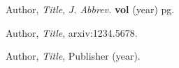\documentclass[a4paper,11pt]{article}
\begin{document}
\begin{thebibliography}{99}

Author, \emph{Title}, \emph{J. Abbrev.} {\bf vol} (year) pg.

Author, \emph{Title},
arxiv:1234.5678.

Author, \emph{Title},
Publisher (year).





\end{thebibliography}
\end{document}
